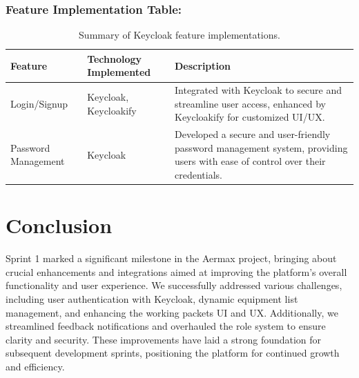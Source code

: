 \subsubsection{Feature Implementation Table:}
\begin{table}[H]
\centering
\begin{tabularx}{\textwidth}{|X|X|X|}
\hline
\textbf{Feature} & \textbf{Technology Implemented} & \textbf{Description} \\
\hline
Login/Signup & Keycloak, Keycloakify & Integrated with Keycloak to secure and streamline user access, enhanced by Keycloakify for customized UI/UX. \\
\hline
Password Management & Keycloak & Developed a secure and user-friendly password management system, providing users with ease of control over their credentials. \\
\hline
\end{tabularx}
\caption{Summary of Keycloak feature implementations.}
\label{tab:keycloak_features}
\end{table}


\section{Conclusion}
Sprint 1 marked a significant milestone in the Aermax project, bringing about crucial enhancements and integrations aimed at improving the platform's overall functionality and user experience. We successfully addressed various challenges, including user authentication with Keycloak, dynamic equipment list management, and enhancing the working packets UI and UX. Additionally, we streamlined feedback notifications and overhauled the role system to ensure clarity and security. These improvements have laid a strong foundation for subsequent development sprints, positioning the platform for continued growth and efficiency.
